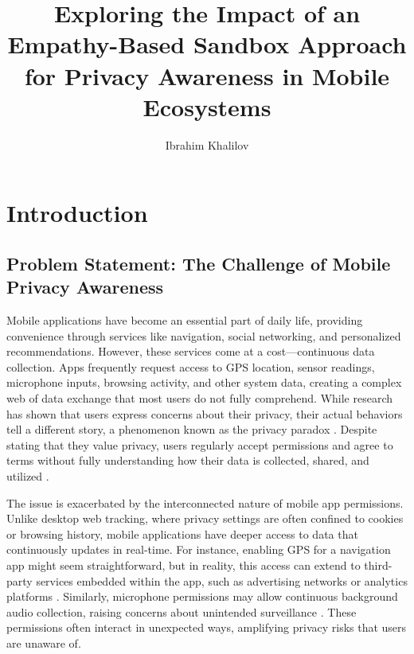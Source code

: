 \documentclass[acmlarge, nonacm]{acmart}
\begin{document}
\title{Exploring the Impact of an Empathy-Based Sandbox
Approach for Privacy Awareness in Mobile Ecosystems}

\author{Ibrahim Khalilov}

\maketitle

\section{Introduction}

\subsection{Problem Statement: The Challenge of Mobile Privacy Awareness}

Mobile applications have become an essential part of daily life, providing convenience through services like navigation, social networking, and personalized recommendations. However, these services come at a cost—continuous data collection. Apps frequently request access to GPS location, sensor readings, microphone inputs, browsing activity, and other system data, creating a complex web of data exchange that most users do not fully comprehend. While research has shown that users express concerns about their privacy, their actual behaviors tell a different story, a phenomenon known as the privacy paradox \cite{baruh2017big}. Despite stating that they value privacy, users regularly accept permissions and agree to terms without fully understanding how their data is collected, shared, and utilized \cite{kokolakis2017privacy}.

The issue is exacerbated by the interconnected nature of mobile app permissions. Unlike desktop web tracking, where privacy settings are often confined to cookies or browsing history, mobile applications have deeper access to data that continuously updates in real-time. For instance, enabling GPS for a navigation app might seem straightforward, but in reality, this access can extend to third-party services embedded within the app, such as advertising networks or analytics platforms \cite{embedded_GPS}. Similarly, microphone permissions may allow continuous background audio collection, raising concerns about unintended surveillance \cite{Gao2019}. These permissions often interact in unexpected ways, amplifying privacy risks that users are unaware of.
\end{document}
